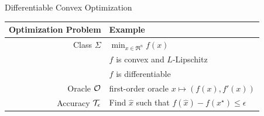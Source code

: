 \documentclass[9pt]{beamer}
\begin{document}
\begin{frame}{Differentiable Convex Optimization}
  
  \begin{center}
    \begin{tabular}{r|l}
      \hline
      Optimization Problem & Example \\[0.5em]
      \hline
      Class $\Sigma$ & $\min_{x\in  \Re^n} f(x)$ \\[0.5em]
                           & $f$ is convex and $L$-Lipschitz\\[0.5em]
                           & $f$ is differentiable \\[0.5em]
      Oracle $\mathcal O$ & first-order oracle $x\mapsto (f(x), f'(x))$\\[0.5em]
      Accuracy $\mathcal T_\epsilon$ & Find $\hat x$ such that $f(\hat x)-f(x^\star)\leq\epsilon$\\[0.5em]
      \hline
    \end{tabular}
  \end{center}

  \vfill


  \vfill

\end{frame}
\end{document}
